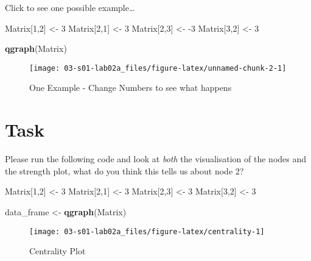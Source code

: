 \documentclass[]{book}
\newenvironment{Shaded}{\begin{snugshade}}{\end{snugshade}}
\newcommand{\DecValTok}[1]{\textcolor[rgb]{0.00,0.00,0.81}{#1}}
\newcommand{\KeywordTok}[1]{\textcolor[rgb]{0.13,0.29,0.53}{\textbf{#1}}}
\newcommand{\NormalTok}[1]{#1}
\newcommand{\StringTok}[1]{\textcolor[rgb]{0.31,0.60,0.02}{#1}}
\begin{document}
Click to see one possible example\ldots{}

\begin{Shaded}
\begin{Highlighting}[]
\NormalTok{Matrix[}\DecValTok{1}\NormalTok{,}\DecValTok{2}\NormalTok{] <-}\StringTok{ }\DecValTok{3}
\NormalTok{Matrix[}\DecValTok{2}\NormalTok{,}\DecValTok{1}\NormalTok{] <-}\StringTok{ }\DecValTok{3}
\NormalTok{Matrix[}\DecValTok{2}\NormalTok{,}\DecValTok{3}\NormalTok{] <-}\StringTok{ }\DecValTok{-3}
\NormalTok{Matrix[}\DecValTok{3}\NormalTok{,}\DecValTok{2}\NormalTok{] <-}\StringTok{ }\DecValTok{3}

\KeywordTok{qgraph}\NormalTok{(Matrix)}
\end{Highlighting}
\end{Shaded}

\begin{figure}

{\centering \texttt{[image: 03-s01-lab02a\_files/figure-latex/unnamed-chunk-2-1]} 

}

\caption{One Example - Change Numbers to see what happens}\label{fig:unnamed-chunk-2}
\end{figure}

\hypertarget{task}{%
\section{Task}\label{task}}

Please run the following code and look at \emph{both} the visualisation of the nodes and the strength plot, what do you think this tells us about node 2?

\begin{Shaded}
\begin{Highlighting}[]
\NormalTok{Matrix[}\DecValTok{1}\NormalTok{,}\DecValTok{2}\NormalTok{] <-}\StringTok{ }\DecValTok{3}
\NormalTok{Matrix[}\DecValTok{2}\NormalTok{,}\DecValTok{1}\NormalTok{] <-}\StringTok{ }\DecValTok{3}
\NormalTok{Matrix[}\DecValTok{2}\NormalTok{,}\DecValTok{3}\NormalTok{] <-}\StringTok{ }\DecValTok{3}
\NormalTok{Matrix[}\DecValTok{3}\NormalTok{,}\DecValTok{2}\NormalTok{] <-}\StringTok{ }\DecValTok{3}

\NormalTok{data_frame <-}\StringTok{ }\KeywordTok{qgraph}\NormalTok{(Matrix)}
\end{Highlighting}
\end{Shaded}

\begin{figure}

{\centering \texttt{[image: 03-s01-lab02a\_files/figure-latex/centrality-1]} 

}

\caption{Centrality Plot}\label{fig:centrality1}
\end{figure}
\end{document}
